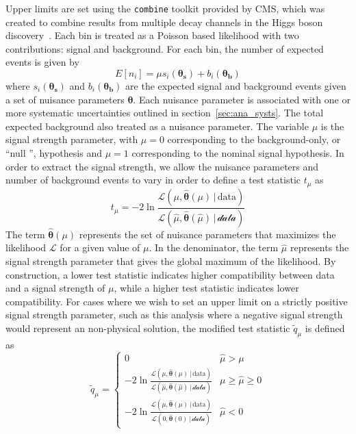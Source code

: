 Upper limits are set using the \texttt{combine} toolkit provided by CMS, which was created to combine results from multiple decay channels in the Higgs boson discovery~\cite{CMS:2024onh}. Each bin is treated as a Poisson based likelihood with two contributions: signal and background. For each bin, the number of expected events is given by
\begin{equation}
	\label{eq:expected_events}
	E[n_i]=\mu s_i(\boldsymbol{\theta_s})+b_i(\boldsymbol{\theta_b})
\end{equation}
where $s_i(\boldsymbol{\theta_s})$ and $b_i(\boldsymbol{\theta_b})$ are the expected signal and background events given a set of nuisance parameters $\boldsymbol{\theta}$. Each nuisance parameter is associated with one or more systematic uncertainties outlined in section~\ref{sec:ana_systs}. The total expected background also treated as a nuisance parameter. The variable $\mu$ is the signal strength parameter, with $\mu=0$ corresponding to the background-only, or ``null '', hypothesis and $\mu=1$ corresponding to the nominal signal hypothesis. In order to extract the signal strength, we allow the nuisance parameters and number of background events to vary in order to define a test statistic $t_\mu$ as
\begin{equation}
	\label{eq:test_stat}
	t_\mu=-2\ln{\frac{\mathcal{L}(\mu, \hat{\boldsymbol{\theta}}(\mu)\,| \, \text{data})}{\mathcal{L(\hat{\mu}, \hat{\boldsymbol{\theta}}(\hat{\mu})\,|\,\text{data})}}}
\end{equation}
The term $\hat{\boldsymbol{\theta}}(\mu)$ represents the set of nuisance parameters that maximizes the likelihood $\mathcal{L}$ for a given value of $\mu$. In the denominator, the term $\hat{\mu}$ represents the signal strength parameter that gives the global maximum of the likelihood. By construction, a lower test statistic indicates higher compatibility between data and a signal strength of $\mu$, while a higher test statistic indicates lower compatibility. For cases where we wish to set an upper limit on a strictly positive signal strength parameter, such as this analysis where a negative signal strength would represent an non-physical solution, the modified test statistic $\tilde{q}_\mu$ is defined as
\begin{equation}
	\label{eq:test_stat2}
	\tilde{q}_\mu=\begin{cases}
		0 & \hat{\mu}>\mu \\
		-2\ln{\frac{\mathcal{L}(\mu,\hat{\boldsymbol{\theta}}(\mu)\,|\,\text{data})}{\mathcal{L(\hat{\mu}, \hat{\boldsymbol{\theta}}(\hat{\mu})\,|\,\text{data})}}} & \mu\geq\hat{\mu}\geq0 \\
		-2\ln{\frac{\mathcal{L}(\mu,\hat{\boldsymbol{\theta}}(\mu)\,|\,\text{data})}{\mathcal{L(\text{0} , \hat{\boldsymbol{\theta}}( \text{0} )\,|\,\text{data})}}} & \hat{\mu}<0
	\end{cases}
\end{equation}

